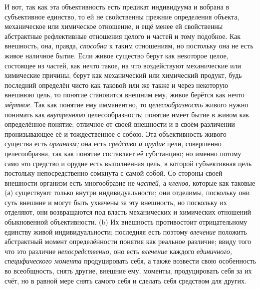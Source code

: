 И вот, так как эта объективность есть предикат индивидуума и
вобрана в субъективное единство, то ей не свойственны прежние определения
объекта, механическое или химическое отношение, и ещё менее ей свойственны
абстрактные рефлективные отношения целого и частей и тому подобное. Как
внешность, она, правда, {\em способна}
к таким отношениям, но постольку она не есть живое наличное
бытие. Если живое существо берут как некоторое целое, состоящее из частей,
как нечто такое, на что воздействуют механические или химические причины,
берут как механический или химический продукт, будь последний определён
чисто как таковой или же также и через некоторую внешнюю
цель, то понятие становится внешним ему, живое берётся как нечто
{\em мёртвое}. Так как
понятие ему имманентно, то
{\em целесообразность}
живого нужно понимать как
{\em внутреннюю}
целесообразность; понятие имеет бытие в живом как
определённое понятие; отличное от своей внешности и в своём различении
пронизывающее её и тождественное с собою. Эта объективность живого существа
есть {\em организм;} она есть {\em средство и орудие}
цели, совершенно целесообразна, так как понятие составляет её
субстанцию; но именно потому само это средство и орудие есть выполненная
цель, в которой субъективная цель постольку непосредственно сомкнута с
самой собой. Со стороны своей внешности организм есть многообразие не
{\em частей,} а
{\em членов,} которые как
таковые (а) существуют только внутри индивидуальности; они отделимы,
поскольку они суть внешние и могут быть ухвачены за эту внешность, но
поскольку их отделяют, они возвращаются под власть механических и
химических отношений обыкновенной объективности. (b) Их внешность
противостоит отрицательному единству живой индивидуальности; последняя есть
поэтому {\em влечение}
положить абстрактный момент определённости понятия как
реальное различие; ввиду того что это различие
{\em непосредственно,}
оно есть {\em влечение}
каждого {\em единичного,}
{\em специфического момента}
продуцировать себя, а также возвести свою особенность во
всеобщность, снять другие, внешние ему, моменты, продуцировать себя за их
счёт, но в равной мере снять самого себя и сделать себя средством для
других.

